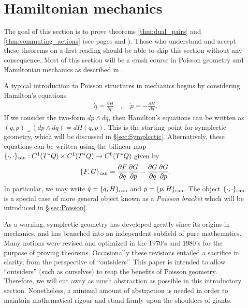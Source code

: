 \documentclass[12pt]{amsart}
\newcommand{\pder}[2]{\ensuremath{\frac{\partial #1}{\partial #2}}}
\begin{document}
\appendix


\section{Hamiltonian mechanics}
\label{sec:Hamiltonian}
The goal of this section is to prove theorems \ref{thm:dual_pairs}
and \ref{thm:commuting_actions} (see pages \pageref{thm:dual_pairs} and \pageref{thm:commuting_actions}).
Those who understand and accept these theorems on a first reading
should be able to skip this section without any consequence.
Most of this section will be a crash course in Poisson geometry
and Hamiltonian mechanics as described in \cite{FOM,MandS,Weinstein1983}.

A typical introduction to Poisson structures in mechanics
begins by considering Hamilton's equations
\begin{align*}
  \dot{q} = \pder{H}{p} \quad, \quad  \dot{p} = - \pder{H}{q}.
\end{align*}
If we consider the two-form $dp \wedge dq$, then Hamilton's equations
can be written as $(\dot{q},\dot{p}) \lrcorner (dp \wedge dq) = dH(q,p)$.
This is the starting point for symplectic geometry, which
will be discussed in \S \ref{sec:Symplectic}.
Alternatively, these equations can be written using the bilinear map $\{ \cdot , \cdot \}_{\rm can} : C^1( T^*Q) \times C^1(T^*Q) \to C^0(T^*Q)$
given by
\begin{align*}
  \{ F , G \}_{\rm can} = \pder{F}{q}\pder{G}{p} - \pder{G}{q} \pder{G}{p}.
\end{align*}
In particular, we may write $\dot{q} = \{ q , H \}_{\rm can}$ and $\dot{p} = \{ p , H\}_{\rm can}$.
The object $\{ \cdot , \cdot \}_{\rm can}$ is a special case of more general
object known as a \emph{Poisson bracket} which will be introduced in
\S \ref{sec:Poisson}.

As a warning, symplectic geometry has developed greatly
since its origins in mechanics, and
has branched into an independent subfield of pure mathematics.
Many notions were revised and optimized in the $1970$'s and $1980$'s for
the purpose of proving theorems.
Occasionally these revisions entailed a sacrifice
in clarity, from the perspective of ``outsiders''.
This paper is intended to allow ``outsiders''
(such as ourselves) to reap the benefits of Poisson geometry.
Therefore, we will cut away as much abstraction as possible in this introductory
section.
Nonetheless, a minimal amount of abstraction is needed in order to
maintain mathematical rigour and stand firmly upon the shoulders of giants.
\end{document}
